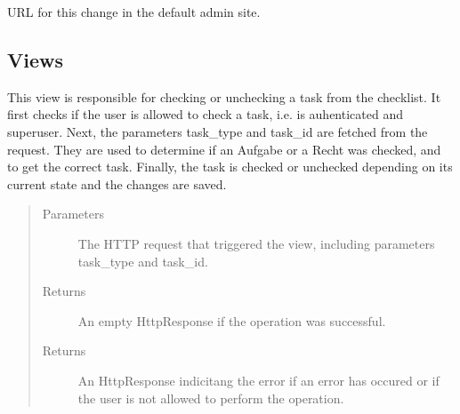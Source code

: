 \documentclass[letterpaper,10pt,english]{sphinxmanual}
\begin{document}
\begin{fulllineitems}

\begin{fulllineitems}
\label{\detokenize{masterCodeDoc:checklisten.models.HistoricalChecklisteRecht.revert_url}}
URL for this change in the default admin site.

\end{fulllineitems}


\end{fulllineitems}



\subsection{Views}
\label{\detokenize{masterCodeDoc:id10}}\label{\detokenize{masterCodeDoc:module-checklisten.views}}

\begin{fulllineitems}
\label{\detokenize{masterCodeDoc:checklisten.views.abhaken}}
This view is responsible for checking or unchecking a task from the checklist.
It first checks if the user is allowed to check a task, i.e. is auhenticated and superuser.
Next, the parameters task\_type and task\_id are fetched from the request. They are used to determine if an Aufgabe or a Recht was checked, and to get the correct task.
Finally, the task is checked or unchecked depending on its current state and the changes are saved.
\begin{quote}\begin{description}
\item[{Parameters}] \leavevmode
{} \textendash{} The HTTP request that triggered the view, including parameters task\_type and task\_id.

\item[{Returns}] \leavevmode
An empty HttpResponse if the operation was successful.

\item[{Returns}] \leavevmode
An HttpResponse indicitang the error if an error has occured or if the user is not allowed to perform the operation.

\end{description}\end{quote}

\end{fulllineitems}
\end{document}

